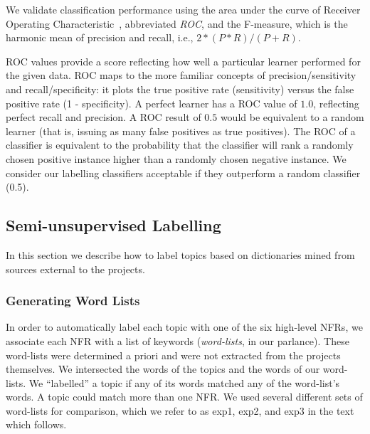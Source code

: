 \documentclass[smallextended]{svjour3}       %
\begin{document}
We validate classification performance using the area under the curve
of Receiver Operating
Characteristic~\cite{Fawcett2006861},
abbreviated \emph{ROC}, and the F-measure, which is the harmonic mean of precision and recall, i.e., $2 * (P * R) / (P + R)$. 

ROC values provide a score %
 reflecting how well a particular learner performed for the given data. 
ROC maps to the more familiar concepts of precision/sensitivity and recall/specificity: it plots the true positive rate (sensitivity) versus the false
positive rate (1 - specificity). 
A perfect learner has a ROC value of $1.0$, reflecting perfect recall and precision. 
A ROC result of $0.5$ would be equivalent to a random learner (that is, issuing as many false positives as true positives). 
The %
ROC of a classifier is equivalent to the probability that the classifier will rank a randomly chosen positive instance higher than a randomly chosen
negative instance.
We consider our labelling classifiers acceptable if they outperform a random classifier (0.5). 

\subsection{Semi-unsupervised Labelling}
\label{sec:unsuplabelling}

In this section we describe how to label topics based on dictionaries
mined from sources external to the projects.


\subsubsection{Generating Word Lists}


In order to automatically label each topic with 
one of the six high-level NFRs,
we associate each NFR with a list
of keywords (\emph{word-lists}, in our parlance). These word-lists were determined a priori and were not extracted from the projects themselves.
We intersected the words of the topics and the words of our word-lists.
We ``labelled'' a topic if any of its words matched any of the word-list's words.
A topic could match more than one NFR.
We used several different sets of word-lists for comparison, which we
refer to as \textsf{exp1}, \textsf{exp2}, and \textsf{exp3} in the text which follows. 
\end{document}
